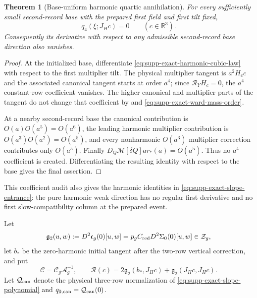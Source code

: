 \documentclass[11pt]{article}
\newtheorem{theorem}{Theorem}[section]
\numberwithin{equation}{section}
\theoremstyle{definition}
\theoremstyle{remark}
\begin{document}
\begin{theorem}[Base-uniform harmonic quartic annihilation]
\label{thm:supp-exact-harmonic-q4-zero}
For every sufficiently small second-record base with the prepared first field
and first tilt fixed,
\begin{equation}
 q_4(\xi;J_Hc)=0\qquad(c\in\mathbb R^3).
 \label{eq:supp-exact-harmonic-q4-zero}
\end{equation}
Consequently its derivative with respect to any admissible second-record base
direction also vanishes.
\end{theorem}
\begin{proof}
At the initialized base, differentiate
\eqref{eq:supp-exact-harmonic-cubic-law} with respect to the first multiplier
tilt.  The physical multiplier tangent is $a^2H_cc$ and the associated
canonical tangent starts at order $a^4$; since $\mathcal R_YH_c=0$, the
$a^4$ constant-row coefficient vanishes.  The higher canonical and
multiplier parts of the tangent do not change that coefficient by
 and
\eqref{eq:supp-exact-ward-mass-order}.

At a nearby second-record base the canonical contribution is
$O(a)O(a^5)=O(a^6)$, the leading harmonic multiplier contribution is
$O(a^3)O(a^2)=O(a^5)$, and every nonharmonic $O(a^3)$ multiplier correction
contributes only $O(a^5)$.  Finally
$D_Q\mathcal M[\delta Q]ar_*(a)=O(a^5)$.  Thus no $a^4$ coefficient is
created.  Differentiating the resulting identity with respect to the base
gives the final assertion.
\end{proof}

This coefficient audit also gives the harmonic identities in
\eqref{eq:supp-exact-slope-entrance}: the pure harmonic weak direction has no
regular first derivative and no first slow-compatibility column at the
prepared event.

Let
\begin{equation}
 \mathfrak g_2(u,w)
 :=D^2\mathfrak c_g(0)[u,w]
 =p_gC_{\rm red}D^2\Sigma_0(0)[u,w]
 \in\mathcal Z_g,
 \label{eq:supp-exact-g2}
\end{equation}
let $b_*$ be the zero-harmonic initial tangent after the two-row vertical
correction, and put
\begin{equation}
 \mathscr C=\mathcal C_g\mathcal A_g^{-1},
 \qquad
 \mathscr R(c)=2\mathfrak g_2(b_*,J_Hc)
                  +\mathfrak g_2(J_Hc,J_Hc).
 \label{eq:supp-exact-R-two-row}
\end{equation}
Let $\mathcal Q_{\rm can}$ denote the physical three-row normalization of
\eqref{eq:supp-exact-slope-polynomial} and
$q_{0,\rm can}=\mathcal Q_{\rm can}(0)$.
\end{document}
